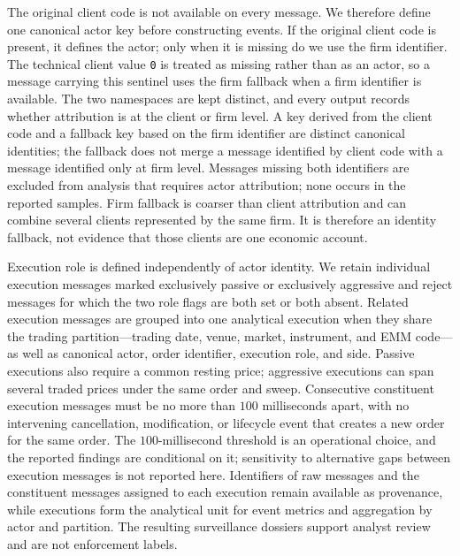 \documentclass[11pt]{article}
\newenvironment{review}{\begingroup\color{blue}}{\endgroup}
\begin{document}
The original client code is not available on every message. We therefore define one canonical actor key before constructing
events. If the original client code is present, it defines the actor; only when it is missing do we use the firm identifier.
The technical client value \texttt{0} is treated as missing rather than as an actor, so a message carrying this sentinel uses
the firm fallback when a firm identifier is available. The two namespaces are kept distinct, and every output records whether
attribution is at the client or firm level. \begin{review}A key derived from the client code and a fallback key based on the firm identifier are distinct canonical identities; the fallback does not merge a message identified by client code with a message identified only at firm level.\end{review} Messages missing both identifiers are
excluded from \begin{review}analysis that requires actor attribution\end{review}; none occurs in the reported samples. Firm fallback is coarser than client
attribution and can combine several clients represented by the same firm. It is therefore an identity fallback, not evidence
that those clients are one economic account.

Execution role is defined independently of actor identity. We retain individual execution messages marked exclusively passive or exclusively
aggressive and reject messages for which the two role flags are both set or both absent. Related execution messages are grouped into
one analytical execution when they share the trading partition---trading date, venue, market, instrument, and EMM code---as
well as canonical actor, order identifier, execution role, and side. Passive executions also require a common resting price;
aggressive executions can span several traded prices under the same order and sweep. Consecutive constituent execution messages must be no more than
$100$ milliseconds apart, with no intervening cancellation, modification, or \begin{review}lifecycle event that creates a new order\end{review} for the same order.
The $100$-millisecond threshold is an operational choice, and the reported findings are conditional on it; sensitivity to
\begin{review}alternative gaps between execution messages\end{review} is not reported here. \begin{review}Identifiers of raw messages\end{review} and the constituent messages assigned to each execution remain available as
provenance, while executions form the analytical unit for event metrics and \begin{review}aggregation by actor and partition\end{review}. The
resulting surveillance dossiers support analyst review and are not enforcement labels.
\end{document}
